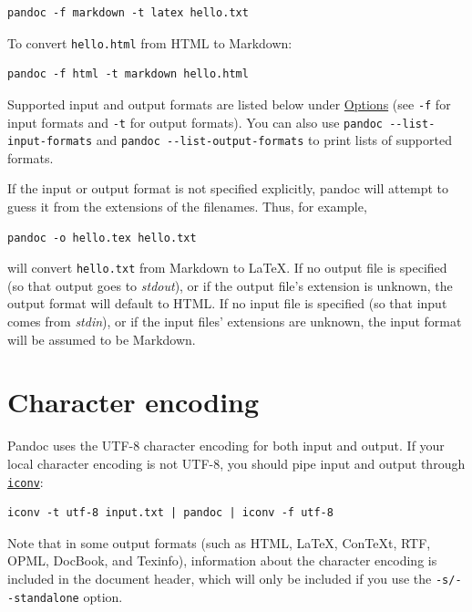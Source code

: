 \documentclass[
  b5paper
]{book}
\begin{document}
\begin{verbatim}
pandoc -f markdown -t latex hello.txt
\end{verbatim}

To convert \texttt{hello.html} from HTML to Markdown:

\begin{verbatim}
pandoc -f html -t markdown hello.html
\end{verbatim}

Supported input and output formats are listed below under
\hyperref[options]{Options} (see \texttt{-f} for input formats and
\texttt{-t} for output formats). You can also use
\texttt{pandoc\ -\/-list-input-formats} and
\texttt{pandoc\ -\/-list-output-formats} to print lists of supported
formats.

If the input or output format is not specified explicitly, pandoc will
attempt to guess it from the extensions of the filenames. Thus, for
example,

\begin{verbatim}
pandoc -o hello.tex hello.txt
\end{verbatim}

will convert \texttt{hello.txt} from Markdown to LaTeX. If no output
file is specified (so that output goes to \emph{stdout}), or if the
output file's extension is unknown, the output format will default to
HTML. If no input file is specified (so that input comes from
\emph{stdin}), or if the input files' extensions are unknown, the input
format will be assumed to be Markdown.

\section{Character encoding}\label{character-encoding}

Pandoc uses the UTF-8 character encoding for both input and output. If
your local character encoding is not UTF-8, you should pipe input and
output through
\href{https://www.gnu.org/software/libiconv/}{\texttt{iconv}}:

\begin{verbatim}
iconv -t utf-8 input.txt | pandoc | iconv -f utf-8
\end{verbatim}

Note that in some output formats (such as HTML, LaTeX, ConTeXt, RTF,
OPML, DocBook, and Texinfo), information about the character encoding is
included in the document header, which will only be included if you use
the \texttt{-s/-\/-standalone} option.
\end{document}
